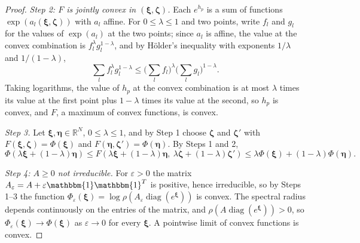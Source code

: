 \documentclass[11pt]{article}
\theoremstyle{plain}
\theoremstyle{definition}
\theoremstyle{remark}
\numberwithin{equation}{section}
\numberwithin{figure}{section}
\numberwithin{table}{section}
\begin{document}
\begin{proof}
\emph{Step 2: $F$ is jointly convex in $(\bm\xi,\bm\zeta)$.} Each $e^{h_p}$ is
a sum of functions $\exp\left(a_l(\bm\xi,\bm\zeta)\right)$ with $a_l$ affine.
For $0\le\lambda\le 1$ and two points, write $f_l$ and $g_l$ for the values of
$\exp(a_l)$ at the two points; since $a_l$ is affine, the value at the convex
combination is $f_l^{\lambda}g_l^{1-\lambda}$, and by H\"older's inequality
with exponents $1/\lambda$ and $1/(1-\lambda)$,
\begin{equation}
\sum_l f_l^{\lambda}g_l^{1-\lambda}\le\Big(\sum_l f_l\Big)^{\lambda}\Big(\sum_l g_l\Big)^{1-\lambda}.
\end{equation}
Taking logarithms, the value of $h_p$ at the convex combination is at most
$\lambda$ times its value at the first point plus $1-\lambda$ times its value
at the second, so $h_p$ is convex, and $F$, a maximum of convex functions, is
convex.

\emph{Step 3.} Let $\bm\xi,\bm\eta\in\mathbb{R}^N$, $0\le\lambda\le 1$, and by
Step 1 choose $\bm\zeta$ and $\bm\zeta'$ with $F(\bm\xi,\bm\zeta)=\Phi(\bm\xi)$
and $F(\bm\eta,\bm\zeta')=\Phi(\bm\eta)$. By Steps 1 and 2,
\begin{equation}
\Phi\left(\lambda\bm\xi+(1-\lambda)\bm\eta\right)
\le F\left(\lambda\bm\xi+(1-\lambda)\bm\eta,\ \lambda\bm\zeta+(1-\lambda)\bm\zeta'\right)
\le\lambda\Phi(\bm\xi)+(1-\lambda)\Phi(\bm\eta).
\end{equation}

\emph{Step 4: $A\ge 0$ not irreducible.} For $\varepsilon>0$ the matrix
$A_\varepsilon=A+\varepsilon\mathbbm{1}\mathbbm{1}^T$ is positive, hence
irreducible, so by Steps 1--3 the function
$\Phi_\varepsilon(\bm\xi)=\log\rho\left(A_\varepsilon\operatorname{diag}\left(e^{\bm\xi}\right)\right)$
is convex. The spectral radius depends continuously on the entries of the
matrix, and $\rho\left(A\operatorname{diag}\left(e^{\bm\xi}\right)\right)>0$, so
$\Phi_\varepsilon(\bm\xi)\to\Phi(\bm\xi)$ as $\varepsilon\to 0$ for every
$\bm\xi$. A pointwise limit of convex functions is convex.
\end{proof}



\end{document}

